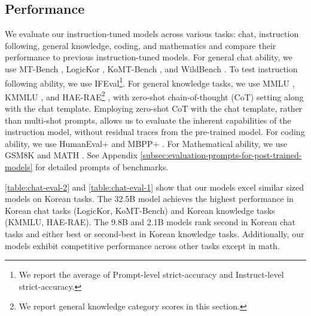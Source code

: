 \subsection{Performance}
\label{subsec:post_train_performance}







We evaluate our instruction-tuned models across various tasks: chat, instruction following, general knowledge, coding, and mathematics and compare their performance to previous instruction-tuned models.
For general chat ability, we use MT-Bench \citep{zheng2023judging}, LogicKor \citep{park2024logickor}, KoMT-Bench \citep{KoMT-Bench}, and WildBench \citep{lin2024wildbench}.
To test instruction following ability, we use IFEval\footnote{We report the average of Prompt-level strict-accuracy and Instruct-level strict-accuracy.}\citep{zhou2023instructionfollowingevaluationlargelanguage}.
For general knowledge tasks, we use MMLU \citep{hendryckstest2021}, KMMLU \citep{son2024kmmlu}, and HAE-RAE\footnote{We report general knowledge category scores in this section.} \citep{son-etal-2024-hae}, with zero-shot chain-of-thought (CoT) \citep{wei2022chainofthought} setting along with the chat template.
Employing zero-shot CoT with the chat template, rather than multi-shot prompts, allows us to evaluate the inherent capabilities of the instruction model, without residual traces from the pre-trained model.
For coding ability, we use HumanEval+ \citep{evalplus} and MBPP+ \citep{evalplus}.
For Mathematical ability, we use GSM8K \citep{cobbe2021gsm8k} and MATH \citep{hendrycksmath2021}.
See Appendix \ref{subsec:evaluation-prompts-for-post-trained-models} for detailed prompts of benchmarks.

\autoref{table:chat-eval-2} and \autoref{table:chat-eval-1} show that our models excel similar sized models on Korean tasks.
The 32.5B model achieves the highest performance in Korean chat tasks (LogicKor, KoMT-Bench) and Korean knowledge tasks (KMMLU, HAE-RAE). 
The 9.8B and 2.1B models rank second in Korean chat tasks and either best or second-best in Korean knowledge tasks.
Additionally, our models exhibit competitive performance across other tasks except in math.

